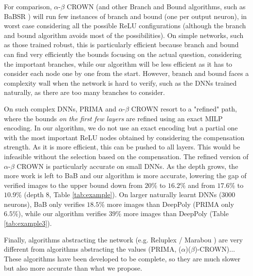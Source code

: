 For comparison, $\alpha$-$\beta$ CROWN \cite{crown} (and other Branch and Bound algorithms, such as BaBSR \cite{BaB}) will run few instances of branch and bound (one per output neuron), in worst case considering all the possible ReLU configurations (although the branch and bound algorithm avoids most of the possibilities). On simple networks, such as those trained robust, this is particularly efficient because branch and bound can find very efficiently the bounds focusing on the actual question, considering the important branches, while our algorithm will be less efficient as it has to consider each node one by one from the start. However, branch and bound faces a complexity wall when the network is hard to verify, such as the DNNs trained naturally, as there are too many branches to consider.

On such complex DNNs, PRIMA and $\alpha$-$\beta$ CROWN resort to a "refined" path, where the bounds {\em on the first few layers} are refined \cite{MILP2} using an exact MILP encoding. In our algorithm, we do not use an exact encoding but a partial one with the most important ReLU nodes obtained by considering the compensation strength. As it is more efficient, this can be pushed to all layers. This would be infeasible without the selection based on the compensation. The refined version of $\alpha$-$\beta$ CROWN is particularly accurate on small DNNs. As the depth grows, the more work is left to BaB and our algorithm is more accurate, lowering the gap of verified images to the upper bound \cite{attack} down from 
$20\%$ to $16.2\%$ and from $17.6\%$ to $10.9\%$ (depth 8, Table \ref{tab:example}). On larger naturally learnt DNNs (3000 neurons), BaB only verifies $18.5\%$ more images than DeepPoly (PRIMA only $6.5\%$), while our algorithm verifies $39\%$ more images than DeepPoly (Table \ref{tab:example3}).

Finally, algorithms abstracting the network (e.g. Reluplex / Marabou \cite{Reluplex,katz2019marabou}) are very different from algorithms abstracting the values (PRIMA, ($\alpha$)($\beta$)-CROWN)\cite{prima,crown}$\ldots$ These algorithms have been developed to be complete, so they are much slower but also more accurate than what we propose.
